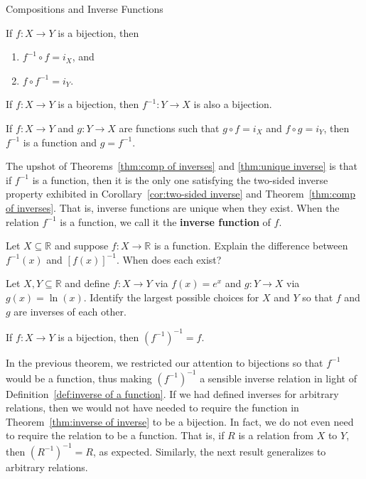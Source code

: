 \begin{section}{Compositions and Inverse Functions}
\begin{theorem}\label{thm:comp of inverses}
If $f:X\to Y$ is a bijection, then
\begin{enumerate}[label=\textrm{(\alph*)}]
\item $f^{-1}\circ f=i_X$, and
\item $f\circ f^{-1}=i_Y$.
\end{enumerate}
\end{theorem}

\begin{theorem}\label{thm:f inverse bijection}
If $f:X\to Y$ is a bijection, then $f^{-1}:Y\to X$ is also a bijection.
\end{theorem}

\begin{theorem}\label{thm:unique inverse}
If $f:X\to Y$ and $g:Y\to X$ are functions such that $g\circ f=i_X$ and $f\circ g=i_Y$, then $f^{-1}$ is a function and $g=f^{-1}$.
\end{theorem}

The upshot of Theorems~\ref{thm:comp of inverses} and \ref{thm:unique inverse} is that if $f^{-1}$ is a function, then it is the only one satisfying the two-sided inverse property exhibited in Corollary~\ref{cor:two-sided inverse} and Theorem~\ref{thm:comp of inverses}. That is, inverse functions are unique when they exist. When the relation $f^{-1}$ is a function, we call it the \textbf{inverse function} of $f$.

\begin{problem}
Let $X\subseteq\mathbb{R}$ and suppose $f:X\to\mathbb{R}$ is a function.  Explain the difference between $f^{-1}(x)$ and $[f(x)]^{-1}$.  When does each exist?
\end{problem}

\begin{problem}
Let $X,Y\subseteq\mathbb{R}$ and define $f:X\to Y$ via $f(x)=e^x$ and $g:Y\to X$ via $g(x)=\ln(x)$.  Identify the largest possible choices for $X$ and $Y$ so that $f$ and $g$ are inverses of each other.
\end{problem}

\begin{theorem}\label{thm:inverse of inverse}
If $f:X\to Y$ is a bijection, then $(f^{-1})^{-1}=f$.
\end{theorem}

In the previous theorem, we restricted our attention to bijections so that $f^{-1}$ would be a function, thus making $(f^{-1})^{-1}$ a sensible inverse relation in light of Definition~\ref{def:inverse of a function}.  If we had defined inverses for arbitrary relations, then we would not have needed to require the function in Theorem~\ref{thm:inverse of inverse} to be a bijection. In fact, we do not even need to require the relation to be a function.  That is, if $R$ is a relation from $X$ to $Y$, then $(R^{-1})^{-1}=R$, as expected. Similarly, the next result generalizes to arbitrary relations.


\end{section}
